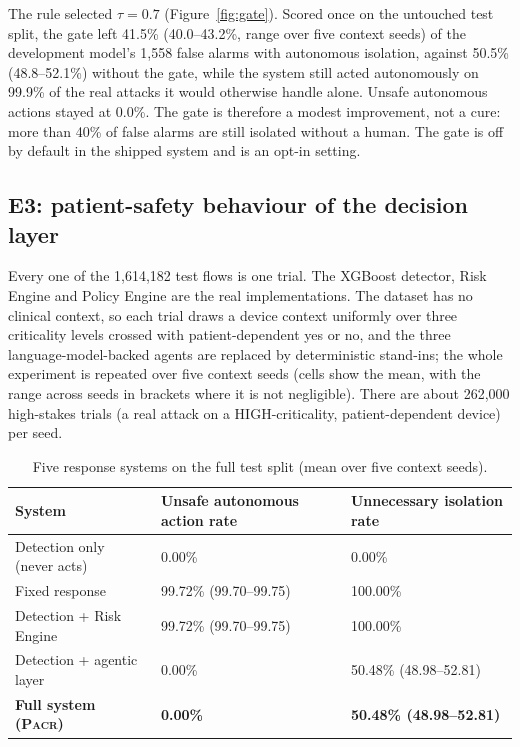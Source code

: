 \documentclass[preprint,12pt]{elsarticle}
\newcommand{\pacr}{\textsc{Pacr}}
\begin{document}
The rule selected $\tau=0.7$ (Figure~\ref{fig:gate}). Scored once on the untouched test split, the gate left 41.5\% (40.0--43.2\%, range over five context seeds) of the development model's 1,558 false alarms with autonomous isolation, against 50.5\% (48.8--52.1\%) without the gate, while the system still acted autonomously on 99.9\% of the real attacks it would otherwise handle alone. Unsafe autonomous actions stayed at 0.0\%. The gate is therefore a modest improvement, not a cure: more than 40\% of false alarms are still isolated without a human. The gate is off by default in the shipped system and is an opt-in setting.

\subsection{E3: patient-safety behaviour of the decision layer}
\label{sec:safety}
Every one of the 1,614,182 test flows is one trial. The XGBoost detector, Risk Engine and Policy Engine are the real implementations. The dataset has no clinical context, so each trial draws a device context uniformly over three criticality levels crossed with patient-dependent yes or no, and the three language-model-backed agents are replaced by deterministic stand-ins; the whole experiment is repeated over five context seeds (cells show the mean, with the range across seeds in brackets where it is not negligible). There are about 262,000 high-stakes trials (a real attack on a HIGH-criticality, patient-dependent device) per seed.

\begin{table}[htbp]
\centering
\caption{Five response systems on the full test split (mean over five context seeds).}
\label{tab:systems}
\small
\begin{tabular}{@{}L{4.8cm}C{3.2cm}C{4.4cm}@{}}
\toprule
System & Unsafe autonomous action rate & Unnecessary isolation rate \\
\midrule
Detection only (never acts) & 0.00\% & 0.00\% \\
Fixed response & 99.72\% (99.70--99.75) & 100.00\% \\
Detection + Risk Engine & 99.72\% (99.70--99.75) & 100.00\% \\
Detection + agentic layer & 0.00\% & 50.48\% (48.98--52.81) \\
\textbf{Full system (\pacr)} & \textbf{0.00\%} & \textbf{50.48\% (48.98--52.81)} \\
\bottomrule
\end{tabular}
\end{table}
\end{document}
